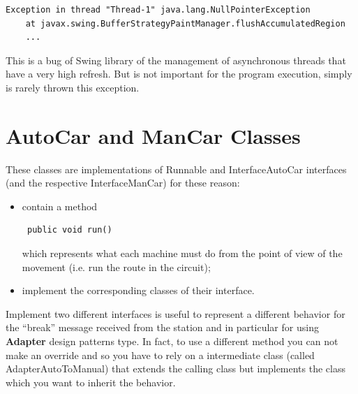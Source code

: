 \documentclass[a4paper,titlepage]{article}
\begin{document}
\begin{verbatim}
Exception in thread "Thread-1" java.lang.NullPointerException
	at javax.swing.BufferStrategyPaintManager.flushAccumulatedRegion
	...
\end{verbatim}

This is a bug of Swing library of the management of asynchronous threads that have a very high refresh. But is not important for the program execution, simply is rarely thrown this exception.

\newpage

\part{AutoCar and ManCar Classes}

These classes are implementations of Runnable and InterfaceAutoCar interfaces (and the respective InterfaceManCar) for these reason:

\begin {itemize}

\item contain a method \begin{verbatim} public void run() \end{verbatim} which represents what each machine must do from the point of view of the movement (i.e. run the route in the circuit);

\item implement the corresponding classes of their interface.

\end {itemize}

Implement two different interfaces is useful to represent a different behavior for the ``break'' message received from the station and in particular for using \textbf{Adapter} design patterns type. In fact, to use a different method you can not make an override and so you have to rely on a intermediate class (called AdapterAutoToManual) that extends the calling class but implements the class which you want to inherit the behavior.
\end{document}
